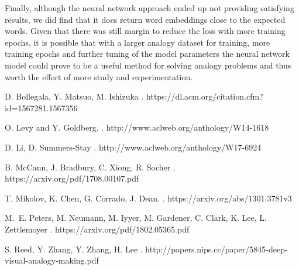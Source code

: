 \documentclass[11pt]{article}
\begin{document}
Finally, although the neural network approach ended up not providing
satisfying results, we did find that it does return word embeddings
close to the expected words. Given that there was still margin to reduce
the loss with more training epochs, it is possible that with a larger
analogy dataset for training, more training epochs and further tuning of
the model parameters the neural network model could prove to be a useful
method for solving analogy problems and thus worth the effort of more
study and experimentation.

\begin{thebibliography}{}

D. Bollegala, Y. Matsuo, M. Ishizuka
.
\newblock https://dl.acm.org/citation.cfm?id=1567281.1567356

O. Levy and Y. Goldberg.
.
\newblock http://www.aclweb.org/anthology/W14-1618

D. Li, D. Summers-Stay
.
\newblock http://www.aclweb.org/anthology/W17-6924

B. McCann, J. Bradbury, C. Xiong, R. Socher
.
\newblock https://arxiv.org/pdf/1708.00107.pdf

T. Mikolov, K. Chen, G. Corrado, J. Dean.
.
\newblock https://arxiv.org/abs/1301.3781v3

M.~E. Peters, M. Neumann, M. Iyyer, M. Gardener, C. Clark, K. Lee, L. Zettlemoyer
.
\newblock https://arxiv.org/pdf/1802.05365.pdf

S. Reed, Y. Zhang, Y. Zhang, H. Lee
.
\newblock http://papers.nips.cc/paper/5845-deep-visual-analogy-making.pdf


\end{thebibliography}
\end{document}
